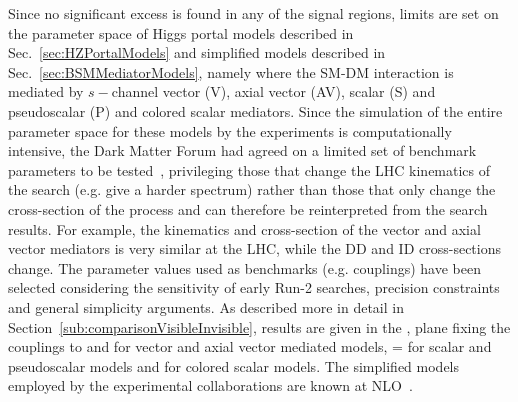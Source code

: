 Since no significant excess is found in any of the signal regions, limits are set on the parameter space of Higgs portal models described in Sec.~\ref{sec:HZPortalModels} and simplified models described in Sec.~\ref{sec:BSMMediatorModels}, namely where the SM-DM interaction is mediated by $s-$channel vector (V), axial vector (AV), scalar (S) and pseudoscalar (P) and colored scalar mediators.  
Since the simulation of the entire parameter space for these models by the experiments is computationally intensive, the Dark Matter Forum had agreed on a limited set of benchmark parameters to be tested~\cite{Abercrombie:2015wmb}, privileging those that change the LHC kinematics of the search (e.g. give a harder \MET spectrum) rather than those that only change the cross-section of the process and can therefore be reinterpreted from the search results. For example, the kinematics and cross-section of the vector and axial vector mediators is very similar at the LHC, while the DD and ID cross-sections change. 
The parameter values used as benchmarks (e.g. couplings) have been selected considering the sensitivity of early Run-2 searches, precision constraints and general simplicity arguments. As described more in detail in Section~\ref{sub:comparisonVisibleInvisible}, results are given in the \mdm, \mmed  plane fixing the couplings to  and  for vector and axial vector mediated models, \gq= for scalar and pseudoscalar models and  for colored scalar models. The simplified models employed by the experimental collaborations are known at NLO~\cite{Neubert:2015fka,Haisch:2013ata,Backovic:2015soa}. 

